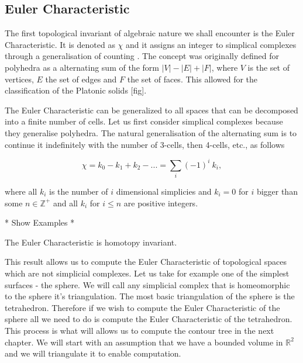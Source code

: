 \subsection{Euler Characteristic}

The first topological invariant of algebraic nature we shall encounter is the Euler Characteristic. It is denoted as $\chi$ and it assigns an integer to simplical complexes through a generalisation of counting \cite{elementary-applied-topology}. The concept was originally defined for polyhedra as a alternating sum of the form $|V| - |E| + |F|$, where $V$ is the set of vertices, $E$ the set of edges and $F$ the set of faces. This allowed for the classification of the Platonic solids [fig].

The Euler Characteristic can be generalized to all spaces that can be decomposed into a finite number of cells. Let us first consider simplical complexes because they generalise polyhedra. The natural generalisation of the alternating sum is to continue it indefinitely with the number of 3-cells, then 4-cells, etc., as follows

$$ \chi = k_0 - k_1 + k_2 - ... = \sum_{i}{(-1)^i~k_i}, $$

where all $k_i$ is the number of $i$ dimensional simplicies and $k_i = 0$ for $i$ bigger than some $n \in \mathbb{Z}^+$ and all $k_i$ for $i \le n$ are positive integers. 

* Show Examples *

\begin{lem}   The Euler Characteristic is homotopy invariant. \end{lem}

This result allows us to compute the Euler Characteristic of topological spaces which are not simplicial complexes. Let us take for example one of the simplest surfaces - the sphere. We will call any simplicial complex that is homeomorphic to the sphere it's triangulation. The most basic triangulation of the sphere is the tetrahedron. Therefore if we wish to compute the Euler Characteristic of the sphere all we need to do is compute the Euler Characteristic of the tetrahedron. This process is what will allows us to compute the contour tree in the next chapter. We will start with an assumption that we have a bounded volume in $\mathbb{R}^2$ and we will triangulate it to enable computation.



